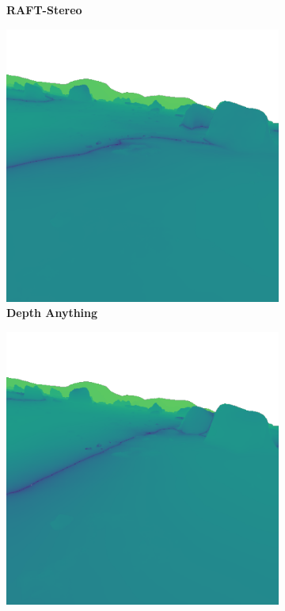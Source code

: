 \begin{figure}[b!]
\begin{subfigure}[b]{0.16\textwidth}
		\caption{\bfseries RAFT-Stereo}
	\end{subfigure}\hfill
	\begin{subfigure}[b]{0.16\textwidth}
		\includegraphics[width=\textwidth]{figures/depth_error_Depth Anything V2 (small).png}
		\caption{\bfseries Depth Anything}
	\end{subfigure}\hfill
	\begin{subfigure}[b]{0.16\textwidth}
		\includegraphics[width=\textwidth]{figures/depth_error_DPT.png}

\end{subfigure}
\end{figure}

